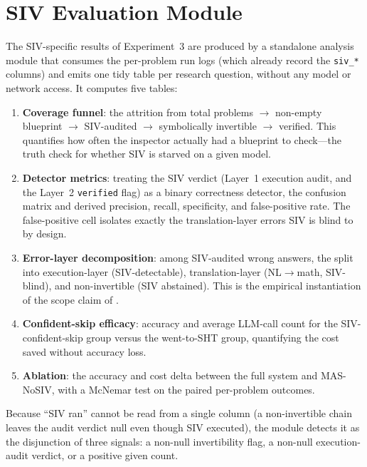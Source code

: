 \documentclass[11pt,a4paper]{article}
\begin{document}
\section{SIV Evaluation Module}
\label{app:siv_eval}
The SIV-specific results of Experiment~3 are produced by a standalone analysis module that consumes the per-problem run logs (which already record the \texttt{siv\_*} columns) and emits one tidy table per research question, without any model or network access.
It computes five tables:
\begin{enumerate}[leftmargin=*,itemsep=2pt]
    \item \textbf{Coverage funnel}: the attrition from total problems $\to$ non-empty blueprint $\to$ SIV-audited $\to$ symbolically invertible $\to$ verified. This quantifies how often the inspector actually had a blueprint to check---the truth check for whether SIV is starved on a given model.
    \item \textbf{Detector metrics}: treating the SIV verdict (Layer~1 execution audit, and the Layer~2 \texttt{verified} flag) as a binary correctness detector, the confusion matrix and derived precision, recall, specificity, and false-positive rate. The false-positive cell isolates exactly the translation-layer errors SIV is blind to by design.
    \item \textbf{Error-layer decomposition}: among SIV-audited wrong answers, the split into execution-layer (SIV-detectable), translation-layer (NL$\to$math, SIV-blind), and non-invertible (SIV abstained). This is the empirical instantiation of the scope claim of .
    \item \textbf{Confident-skip efficacy}: accuracy and average LLM-call count for the SIV-confident-skip group versus the went-to-SHT group, quantifying the cost saved without accuracy loss.
    \item \textbf{Ablation}: the accuracy and cost delta between the full system and MAS-NoSIV, with a McNemar test on the paired per-problem outcomes.
\end{enumerate}
Because ``SIV ran'' cannot be read from a single column (a non-invertible chain leaves the audit verdict null even though SIV executed), the module detects it as the disjunction of three signals: a non-null invertibility flag, a non-null execution-audit verdict, or a positive given count.
\end{document}
